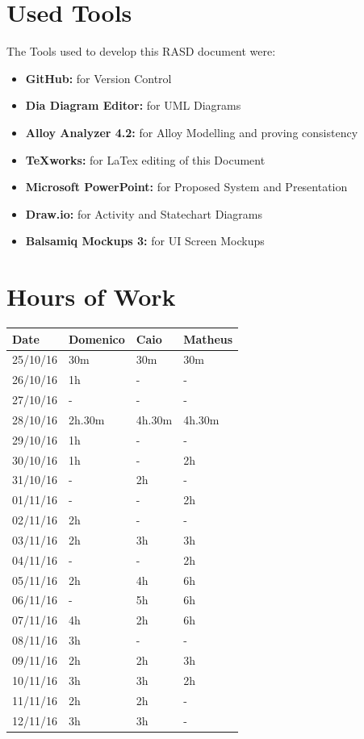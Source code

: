 \documentclass[a4paper]{article}
\begin{document}
\section{Used Tools}
The Tools used to develop this RASD document were:
\begin{itemize}
	\item \textbf{GitHub:} for Version Control
	\item \textbf {Dia Diagram Editor:} for UML Diagrams
	\item \textbf{Alloy Analyzer 4.2:} for Alloy Modelling and proving consistency
	\item \textbf {TeXworks:} for LaTex editing of this Document
	\item \textbf {Microsoft PowerPoint:} for Proposed System and Presentation
	\item \textbf {Draw.io:} for Activity and Statechart Diagrams
	\item \textbf {Balsamiq Mockups 3:} for UI Screen Mockups
\end{itemize}
\newpage

\section{Hours of Work}
\begin{tabular}{ | l | l | l | l | }
\hline
	\textbf {Date} & \textbf {Domenico} & \textbf {Caio} & \textbf {Matheus} \\ \hline
	25/10/16& 30m & 30m & 30m \\ \hline
	26/10/16& 1h & -  & -  \\ \hline
	27/10/16&  - & - & -  \\ \hline
	28/10/16& 2h.30m & 4h.30m & 4h.30m \\ \hline
	29/10/16& 1h & -  & - \\ \hline
	30/10/16&  1h & - & 2h\\ \hline
	31/10/16&  - & 2h & - \\ \hline
	01/11/16&  - & - & 2h \\ \hline
	02/11/16&  2h & - & - \\ \hline
	03/11/16&  2h & 3h & 3h \\ \hline
	04/11/16&  - & - & 2h\\ \hline
	05/11/16&  2h & 4h &  6h\\ \hline
	06/11/16&  - & 5h & 6h\\ \hline
	07/11/16& 4h & 2h & 6h \\ \hline
	08/11/16&  3h & - & - \\ \hline
	09/11/16&  2h & 2h & 3h \\ \hline
	10/11/16&  3h & 3h & 2h\\ \hline
	11/11/16&  2h & 2h & - \\ \hline
	12/11/16&  3h & 3h & - \\ \hline
\end{tabular}
\end{document}

